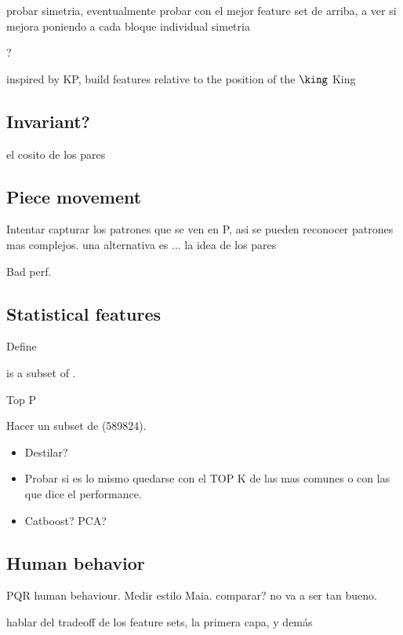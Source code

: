 probar simetria, eventualmente probar con el mejor feature set de arriba, a ver si mejora poniendo a cada bloque individual simetria

?

inspired by KP, build features relative to the position of the $\king$ King

\subsection{Invariant?}

el cosito de los pares

\subsection{Piece movement}

Intentar capturar los patrones que se ven en P, asi se pueden reconocer patrones mas complejos.
una alternativa es ... la idea de los pares


Bad perf.

\subsection{Statistical features}

Define 

 is a subset of .

Top P

Hacer un subset de  (589824).

\begin{itemize}
\item Destilar?
\item Probar si es lo mismo quedarse con el TOP K de las mas comunes o con las que dice el performance.
\item Catboost? PCA?
\end{itemize}

\subsection{Human behavior}

PQR human behaviour. Medir estilo Maia. comparar? no va a ser tan bueno.




hablar del tradeoff de los feature sets, la primera capa, y demás

